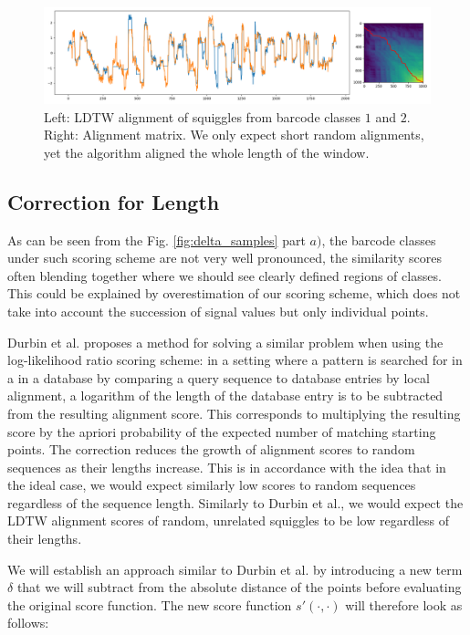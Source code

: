 \begin{figure}[!ht]
    \centering
    \includegraphics[width=15.5cm]{images/zero_delta_alignment.png}
    \caption[Basic LDTW alignment]{Left: LDTW alignment of squiggles from barcode classes $1$ and $2$. Right: Alignment matrix. We only expect short random alignments, yet the algorithm aligned the whole length of the window.}
    \label{fig:zero_delta_align}
\end{figure}

\subsection{Correction for Length}
As can be seen from the Fig. \ref{fig:delta_samples}  part $a)$, the barcode classes under such scoring scheme are not very well pronounced, the similarity scores often blending together where we should see clearly defined regions of classes. This could be explained by overestimation of our scoring scheme, which does not take into account the succession of signal values but only individual points.

Durbin et al. \cite{Durbin1998} proposes a method for solving a similar problem when using the log-likelihood ratio scoring scheme: in a setting where a pattern is searched for in a in a database by comparing a query sequence to database entries by local alignment, a logarithm of the length of the database entry is to be subtracted from the resulting alignment score. This corresponds to multiplying the resulting score by the apriori probability of the expected number of matching starting points. The correction reduces the growth of alignment scores to random sequences as their lengths increase. This is in accordance with the idea that in the ideal case, we would expect similarly low scores to random sequences regardless of the sequence length. Similarly to Durbin et al., we would expect the LDTW alignment scores of random, unrelated squiggles to be low regardless of their lengths.

We will establish an approach similar to Durbin et al. by introducing a new term $\delta$ that we will subtract from the absolute distance of the points before evaluating the original score function. The new score function $s'(\cdot, \cdot)$ will therefore look as follows:


